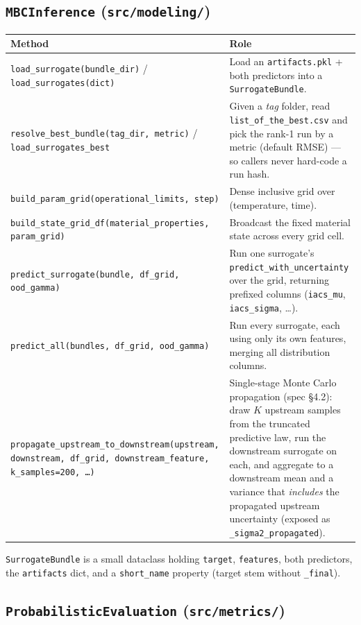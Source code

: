 \documentclass[11pt,a4paper]{article}
\newcommand{\code}[1]{\texttt{\small #1}}
\newcommand{\file}[1]{\texttt{\small #1}}
\begin{document}
\subsection{\code{MBCInference} (\file{src/modeling/})}

\begin{longtable}{@{}p{}p{}@{}}
\toprule
\textbf{Method} & \textbf{Role} \\
\midrule
\endhead
\code{load\_surrogate(bundle\_dir)} / \code{load\_surrogates(dict)} &
  Load an \code{artifacts.pkl} + both predictors into a \code{SurrogateBundle}. \\
\code{resolve\_best\_bundle(tag\_dir, metric)} / \code{load\_surrogates\_best} &
  Given a \emph{tag} folder, read \file{list\_of\_the\_best.csv} and pick the
  rank-1 run by a metric (default RMSE) --- so callers never hard-code a run
  hash. \\
\code{build\_param\_grid(operational\_limits, step)} &
  Dense inclusive grid over (temperature, time). \\
\code{build\_state\_grid\_df(material\_properties, param\_grid)} &
  Broadcast the fixed material state across every grid cell. \\
\code{predict\_surrogate(bundle, df\_grid, ood\_gamma)} &
  Run one surrogate's \code{predict\_with\_uncertainty} over the grid, returning
  prefixed columns (\code{iacs\_mu}, \code{iacs\_sigma}, \dots). \\
\code{predict\_all(bundles, df\_grid, ood\_gamma)} &
  Run every surrogate, each using only its own features, merging all
  distribution columns. \\
\code{propagate\_upstream\_to\_downstream(upstream, downstream, df\_grid,
  downstream\_feature, k\_samples=200, \dots)} &
  Single-stage Monte Carlo propagation (spec \S4.2): draw $K$ upstream samples
  from the truncated predictive law, run the downstream surrogate on each, and
  aggregate to a downstream mean and a variance that \emph{includes} the
  propagated upstream uncertainty (exposed as \code{*\_sigma2\_propagated}). \\
\bottomrule
\end{longtable}

\noindent
\code{SurrogateBundle} is a small dataclass holding \code{target},
\code{features}, both predictors, the \code{artifacts} dict, and a
\code{short\_name} property (target stem without \code{\_final}).

\subsection{\code{ProbabilisticEvaluation} (\file{src/metrics/})}
\end{document}
